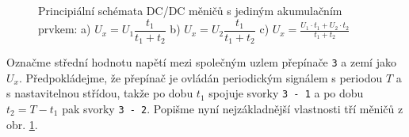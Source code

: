         \begin{figure}[ht!]  %
          \centering
            {}     
            {}       
            {}
          \caption{Principiální schémata DC/DC měničů s jediným akumulačním prvkem: a) 
            $U_x=U_1\dfrac{t_1}{t_1+t_2}$ b) $U_x=U_2\dfrac{t_1}{t_1+t_2}$ c) 
            $U_x=\frac{U_1\cdot t_1 + U_2\cdot t_2}{t_1+t_2}$}
          \label{enz:fig_002}
        \end{figure}
        
        Označme střední hodnotu napětí mezi společným uzlem přepínače \texttt{3} a zemí jako $U_x$. 
        Předpokládejme, že přepínač je ovládán periodickým signálem s periodou $T$ a s 
        nastavitelnou střídou, takže po dobu  $t_1$ spojuje svorky \texttt{3 - 1} a po dobu  $t_2 = 
        T - t_1$ pak svorky \texttt{3 - 2}. Popišme nyní nejzákladnější vlastnosti tří měničů z 
        obr. \ref{enz:fig_002}.
        
